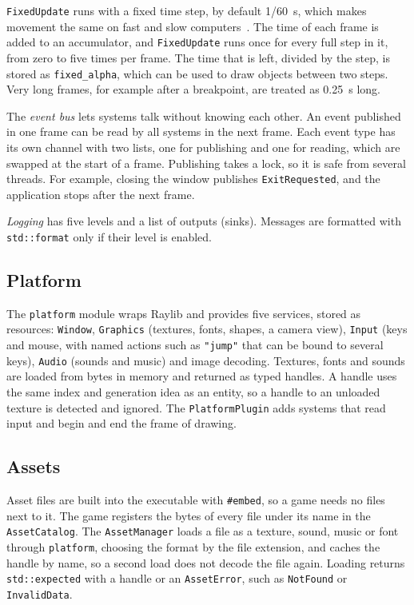 \documentclass[conference]{IEEEtran}
\newcommand{\code}[1]{\texttt{#1}}
\begin{document}
\code{FixedUpdate} runs with a fixed time step, by default 1/60~s, which makes movement
the same on fast and slow computers~\cite{fiedler}. The time of each frame is added to an
accumulator, and \code{FixedUpdate} runs once for every full step in it, from zero to five
times per frame. The time that is left, divided by the step, is stored as
\code{fixed\_alpha}, which can be used to draw objects between two steps. Very long frames,
for example after a breakpoint, are treated as 0.25~s long.

The \emph{event bus} lets systems talk without knowing each other. An event published in
one frame can be read by all systems in the next frame. Each event type has its own
channel with two lists, one for publishing and one for reading, which are swapped at the
start of a frame. Publishing takes a lock, so it is safe from several threads. For
example, closing the window publishes \code{ExitRequested}, and the application stops
after the next frame.

\emph{Logging} has five levels and a list of outputs (sinks). Messages are formatted with
\code{std::format} only if their level is enabled.

\subsection{Platform}

The \code{platform} module wraps Raylib and provides five services, stored as resources:
\code{Window}, \code{Graphics} (textures, fonts, shapes, a camera view),
\code{Input} (keys and mouse, with named actions such as \code{"jump"} that can be
bound to several keys), \code{Audio} (sounds and music) and image decoding. Textures,
fonts and sounds are loaded from bytes in memory and returned as typed handles. A handle
uses the same index and generation idea as an entity, so a handle to an unloaded texture
is detected and ignored. The \code{PlatformPlugin} adds systems that read input and
begin and end the frame of drawing.

\subsection{Assets}

Asset files are built into the executable with \code{\#embed}, so a game needs no files
next to it. The game registers the bytes of every file under its name in the
\code{AssetCatalog}. The \code{AssetManager} loads a file as a texture, sound, music or
font through \code{platform}, choosing the format by the file extension, and caches the
handle by name, so a second load does not decode the file again. Loading returns
\code{std::expected} with a handle or an \code{AssetError}, such as \code{NotFound} or
\code{InvalidData}.
\end{document}
